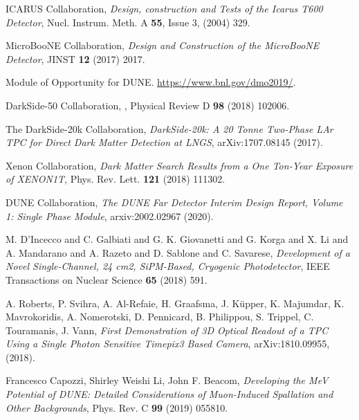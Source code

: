 \documentclass[a4paper,11pt]{article}
\begin{document}
\begin{thebibliography}{99}

ICARUS Collaboration, \emph{Design, construction and Tests of the Icarus T600 Detector}, Nucl. Instrum. Meth. A {\bf 55}, Issue 3, (2004) 329.

MicroBooNE Collaboration, \emph{Design and Construction of the MicroBooNE Detector}, JINST {\bf 12} (2017) 2017.

{Module of Opportunity for DUNE}.
\newblock \url{https://www.bnl.gov/dmo2019/}.

DarkSide-50 Collaboration, 
,
\newblock Physical Review D {\bf 98}  (2018) 102006.

The DarkSide-20k Collaboration, \emph{DarkSide-20k: A 20 Tonne Two-Phase LAr TPC for Direct Dark Matter Detection at LNGS},
 arXiv:1707.08145 (2017).

Xenon Collaboration, \emph{Dark Matter Search Results from a One Ton-Year Exposure of XENON1T}, Phys. Rev. Lett. {\bf 121}  (2018) 111302.

DUNE Collaboration, \emph{The DUNE Far Detector Interim Design Report, Volume 1: Single Phase Module}, arxiv:2002.02967 (2020).

M. {D'Incecco} and C. {Galbiati} and G. K. {Giovanetti} and G. {Korga} and X. {Li} and A. {Mandarano} and A. {Razeto} and D. {Sablone} and C. {Savarese}, \emph{Development of a Novel Single-Channel, 24 cm2, SiPM-Based, Cryogenic Photodetector}, IEEE Transactions on Nuclear Science {\bf 65} (2018) 591.

A. Roberts, P. Svihra, A. Al-Refaie, H. Graafsma, J. K{\"u}pper, K. Majumdar, K. Mavrokoridis, A. Nomerotski, D. Pennicard, B. Philippou, S. Trippel, C. Touramanis, J. Vann, \emph{First Demonstration of 3D Optical Readout of a TPC Using a Single Photon Sensitive Timepix3 Based Camera}, arXiv:1810.09955, (2018).

Francesco Capozzi, Shirley Weishi Li, John F. Beacom, \emph{Developing the MeV Potential of DUNE: Detailed Considerations of Muon-Induced Spallation and Other Backgrounds}, Phys. Rev. C {\bf 99} (2019) 055810.



\end{thebibliography}
\end{document}
